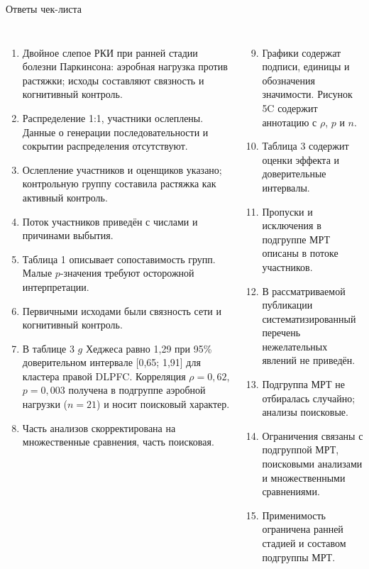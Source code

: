 \documentclass[aspectratio=169]{beamer}
\begin{document}
\begin{frame}{Ответы чек-листа}
  \begin{columns}[T,onlytextwidth]
      \tiny
      \begin{enumerate}
                \item Двойное слепое РКИ при ранней стадии болезни Паркинсона: аэробная нагрузка против растяжки; исходы составляют связность и когнитивный контроль.
        \item Распределение 1:1, участники ослеплены. Данные о генерации последовательности и сокрытии распределения отсутствуют.
        \item Ослепление участников и оценщиков указано; контрольную группу составила растяжка как активный контроль.
        \item Поток участников приведён с числами и причинами выбытия.
        \item Таблица 1 описывает сопоставимость групп. Малые $p$-значения требуют осторожной интерпретации.
        \item Первичными исходами были связность сети и когнитивный контроль.
        \item В таблице 3 $g$ Хеджеса равно 1,29 при 95\% доверительном интервале [0,65; 1,91] для кластера правой DLPFC. Корреляция $\rho = 0{,}62$, $p = 0{,}003$ получена в подгруппе аэробной нагрузки ($n=21$) и носит поисковый характер.
        \item Часть анализов скорректирована на множественные сравнения, часть поисковая.
      \end{enumerate}
      \tiny
      \begin{enumerate}\setcounter{enumi}{8}
                \item Графики содержат подписи, единицы и обозначения значимости. Рисунок 5C содержит аннотацию с $\rho$, $p$ и $n$.
        \item Таблица 3 содержит оценки эффекта и доверительные интервалы.
        \item Пропуски и исключения в подгруппе МРТ описаны в потоке участников.
        \item В рассматриваемой публикации систематизированный перечень нежелательных явлений не приведён.
        \item Подгруппа МРТ не отбиралась случайно; анализы поисковые.
        \item Ограничения связаны с подгруппой МРТ, поисковыми анализами и множественными сравнениями.
        \item Применимость ограничена ранней стадией и составом подгруппы МРТ.
      \end{enumerate}
  \end{columns}
\end{frame}
\end{document}
